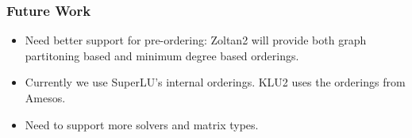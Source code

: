\documentclass[xcolor=dvipsnames]{beamer}
\begin{document}
\begin{frame}
  \frametitle{Future Work}
  \begin{itemize}
  \item Need better support for pre-ordering: Zoltan2 will provide
    both graph partitoning based and minimum degree based orderings.
  \item Currently we use SuperLU's internal orderings. KLU2 uses the
    orderings from Amesos.
  \item Need to support more solvers and matrix types.
  \end{itemize}
\end{frame}
\end{document}
